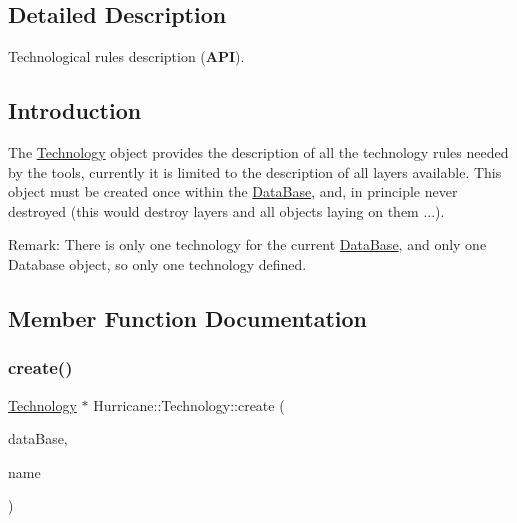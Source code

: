 \subsection{Detailed Description}
Technological rules description ({\bfseries A\+PI}). 

\hypertarget{classHurricane_1_1Technology_sTechnologyIntro}{}\subsection{Introduction}\label{classHurricane_1_1Technology_sTechnologyIntro}
The \hyperlink{classHurricane_1_1Technology}{Technology} object provides the description of all the technology rules needed by the tools, currently it is limited to the description of all layers available. This object must be created once within the \hyperlink{classHurricane_1_1DataBase}{Data\+Base}, and, in principle never destroyed (this would destroy layers and all objects laying on them ...).

\begin{DoxyParagraph}{Remark\+:}
There is only one technology for the current \hyperlink{classHurricane_1_1DataBase}{Data\+Base}, and only one Database object, so only one technology defined. 
\end{DoxyParagraph}


\subsection{Member Function Documentation}
\mbox{\label{classHurricane_1_1Technology_a8fd65387c7fd6ba1396f905fadf20087}} 
\subsubsection{\texorpdfstring{create()}{create()}}
{\footnotesize\ttfamily \hyperlink{classHurricane_1_1Technology}{Technology} $\ast$ Hurricane\+::\+Technology\+::create (\begin{DoxyParamCaption}\item[{\hyperlink{classHurricane_1_1DataBase}{Data\+Base} $\ast$}]{data\+Base,  }\item[{const \hyperlink{classHurricane_1_1Name}{Name} \&}]{name }\end{DoxyParamCaption})\hspace{0.3cm}{\ttfamily [static]}}

